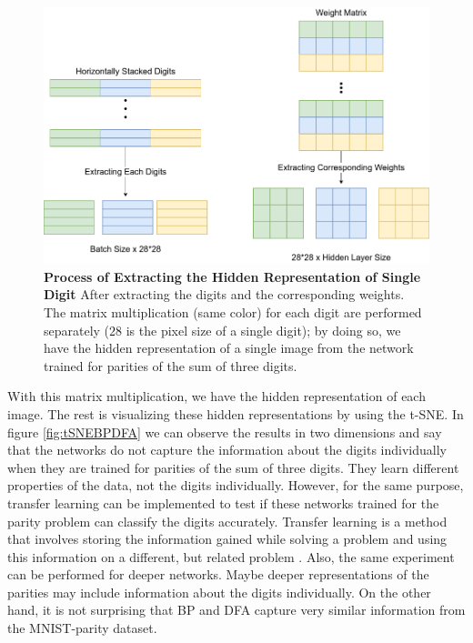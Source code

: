 \documentclass[a4paper, nobind]{templates/ociamthesis}
\begin{document}
\begin{figure}

{\centering \includegraphics[width=1\linewidth]{figures/B_hidden_rep_process} 

}

\caption[Process of Extracting the Hidden Representation of Single Digit ]{\textbf{Process of Extracting the Hidden Representation of Single Digit } \newline After extracting the digits and the corresponding weights. The matrix multiplication (same color) for each digit are performed separately ($28$ is the pixel size of a single digit); by doing so, we have the hidden representation of a single image from the network trained for parities of the sum of three digits.}\label{fig:HiddenRepProcess}
\end{figure}

\noindent With this matrix multiplication, we have the hidden representation of each image. The rest is visualizing these hidden representations by using the t-SNE. In figure \ref{fig:tSNEBPDFA} we can observe the results in two dimensions and say that the networks do not capture the information about the digits individually when they are trained for parities of the sum of three digits. They learn different properties of the data, not the digits individually. However, for the same purpose, transfer learning can be implemented to test if these networks trained for the parity problem can classify the digits accurately. Transfer learning is a method that involves storing the information gained while solving a problem and using this information on a different, but related problem \cite{DBLP:journals/corr/JhaS15}. Also, the same experiment can be performed for deeper networks. Maybe deeper representations of the parities may include information about the digits individually. On the other hand, it is not surprising that BP and DFA capture very similar information from the MNIST-parity dataset.
\end{document}
